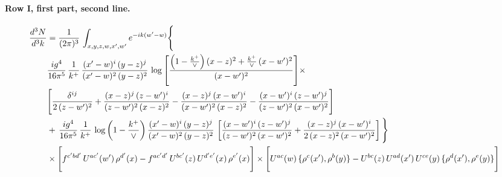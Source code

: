 \documentclass[10pt]{article}
\numberwithin{equation}{section}
\begin{document}
\paragraph{Row I, first part, second line.}
\begin{align}
\frac{d^{3}N}{d^{3}k} & =  \frac{1}{(2\pi)^{3}}\,\int_{x,y,z,w,x',w^{\prime}} e^{-ik(w^{\prime}-w)}\Bigg\{\notag \\
&  \frac{ig^{4}}{16\pi^{5}}\,\frac{1}{k^{+}}\, \frac{(x'-w)^{i}\,(y-z)^{j}}{(x'-w)^{2}\,(y-z)^{2}}\,\log{\left[\frac{\left(1-\frac{k^{+}}{\vee}\right)(x-z)^{2}+\frac{k^{+}}{\vee}\,(x-w')^{2}}{(x-w')^{2}}\right]}\times\notag \\ &  \Bigg[\frac{\delta^{ij}}{2\,(z-w')^{2}}+\frac{(x-z)^{j}\,(z-w')^{i}}{(z-w')^{2}\,(x-z)^{2}}-\frac{(x-z)^{j}\,(x-w')^{i}}{(x-w')^{2}\,(x-z)^{2}}-\frac{(x-w')^{i}\,(z-w')^{j}}{(z-w')^{2}\,(x-w')^{2}}\Bigg] \notag \\
& +\,\frac{ig^{4}}{16\pi^{5}}\,\frac{1}{k^{+}}\,\log{\left(1-\frac{k^{+}}{\vee}\right)}\,\frac{(x'-w)^{i}\,(y-z)^{j}}{(x'-w)^{2}\,(y-z)^{2}}\,\left[\frac{(x-w')^{i}\,(z-w')^{j}}{(z-w')^{2}\,(x-w')^{2}}+\frac{(x-z)^{j}\,(x-w')^{i}}{2\,(x-z)^{2}\, (x-w')^{2}}\right]\Bigg\} \notag \\ & \times\Bigg[f^{c'bd'}\,U^{ac'}(w')\,\rho^{d'}(x)-f^{ac'd'}\, U^{bc'}(z)\,U^{d'e'}(x)\,\rho^{e'}(x)\Bigg] \times \Bigg[U^{ac}(w)\,\{\rho^{c}(x'),\rho^{b}(y)\}-U^{bc}(z)\,U^{ad}(x')\,U^{ce}(y)\, \{\rho^{d}(x'),\rho^{e}(y)\}\Bigg] \label{eq:F:G2I1B}
\end{align}
\end{document}
